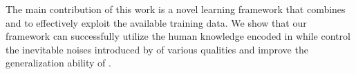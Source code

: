 The main contribution of this work is a novel learning framework that combines \REs and \NNs to effectively exploit the available training
data. We show that our framework can successfully utilize the human knowledge encoded in \REs while control the inevitable noises
introduced by \REs of various qualities and improve the generalization ability of \REs.



